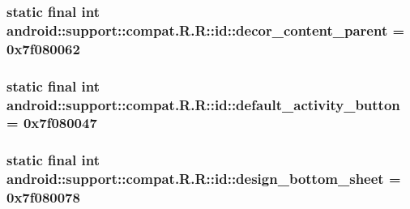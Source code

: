 \hypertarget{classandroid_1_1support_1_1compat_1_1_r_1_1id_f5fe1cb7d7f2e43d99f842ce1139edb8}{
\subsubsection[{decor\_\-content\_\-parent}]{\setlength{\rightskip}{0pt plus 5cm}static final int android::support::compat.R.R::id::decor\_\-content\_\-parent = 0x7f080062}}
\label{classandroid_1_1support_1_1compat_1_1_r_1_1id_f5fe1cb7d7f2e43d99f842ce1139edb8}


\hypertarget{classandroid_1_1support_1_1compat_1_1_r_1_1id_b9d4ddc410087eee0d577c4db6d2d5e3}{
\subsubsection[{default\_\-activity\_\-button}]{\setlength{\rightskip}{0pt plus 5cm}static final int android::support::compat.R.R::id::default\_\-activity\_\-button = 0x7f080047}}
\label{classandroid_1_1support_1_1compat_1_1_r_1_1id_b9d4ddc410087eee0d577c4db6d2d5e3}


\hypertarget{classandroid_1_1support_1_1compat_1_1_r_1_1id_0325de17381de0458fdda3a1242655c0}{
\subsubsection[{design\_\-bottom\_\-sheet}]{\setlength{\rightskip}{0pt plus 5cm}static final int android::support::compat.R.R::id::design\_\-bottom\_\-sheet = 0x7f080078}}
\label{classandroid_1_1support_1_1compat_1_1_r_1_1id_0325de17381de0458fdda3a1242655c0}


